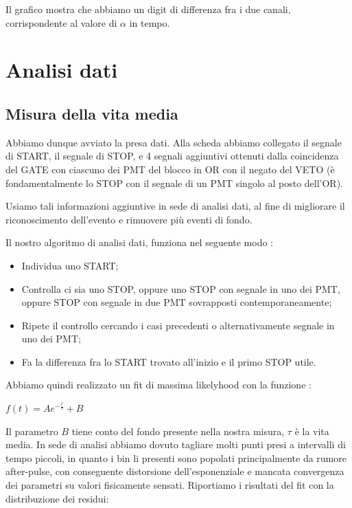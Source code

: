 \documentclass[10pt,a4paper]{article}
\begin{document}
Il grafico mostra che abbiamo un digit di differenza fra i due canali, corrispondente al valore di $\alpha$ in tempo.

\section{Analisi dati}

\subsection{Misura della vita media}

Abbiamo dunque avviato la presa dati. Alla scheda abbiamo collegato il segnale di START, il segnale di STOP, e 4 segnali aggiuntivi ottenuti dalla coincidenza del GATE con ciascuno dei PMT del blocco in OR con il negato del VETO (è fondamentalmente lo STOP con il segnale di un PMT singolo al posto dell'OR).

Usiamo tali informazioni aggiuntive in sede di analisi dati, al fine di migliorare il riconoscimento dell'evento e rimuovere più eventi di fondo. 

Il nostro algoritmo di analisi dati, funziona nel seguente modo :

\begin{itemize}
\item Individua uno START;
\item Controlla ci sia uno STOP, oppure uno STOP con segnale in uno dei PMT, oppure STOP con segnale in due PMT sovrapposti contemporaneamente;
\item Ripete il controllo cercando i casi precedenti o alternativamente segnale in uno dei PMT;
\item Fa la differenza fra lo START trovato all'inizio e il primo STOP utile.
\end{itemize}

Abbiamo quindi realizzato un fit di massima likelyhood con la funzione :
\begin{center}
$f(t) = Ae^{-\frac{t}{\tau}} + B$
\end{center}

Il parametro $B$ tiene conto del fondo presente nella nostra misura, $\tau$ è la vita media. 
In sede di analisi abbiamo dovuto tagliare molti punti presi a intervalli di tempo piccoli, in quanto i bin li presenti sono popolati principalmente da rumore after-pulse, con conseguente distorsione dell'esponenziale e mancata convergenza dei parametri su valori fisicamente sensati.
Riportiamo i risultati del fit con la distribuzione dei residui:
\end{document}

